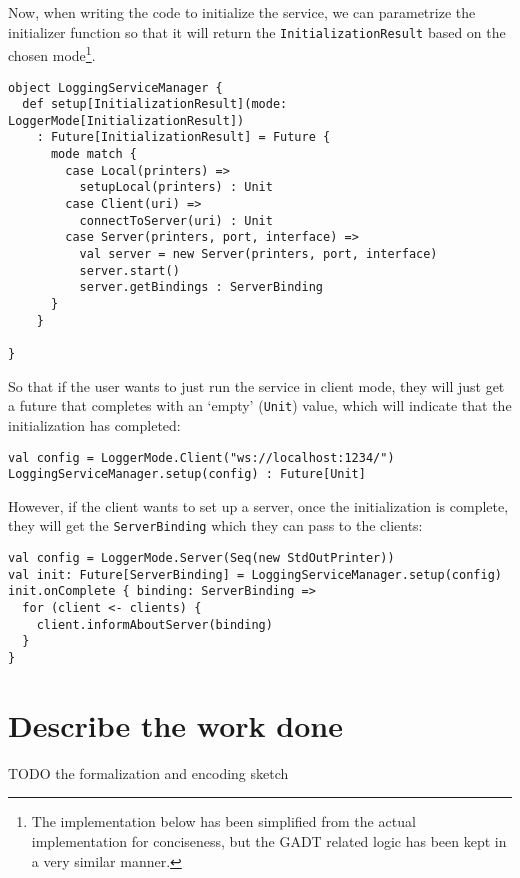 Now, when writing the code to initialize the service, we can parametrize the initializer function so that it will return the \texttt{InitializationResult} based on the chosen mode\footnote{The implementation below has been simplified from the actual implementation for conciseness, but the GADT related logic has been kept in a very similar manner.}.

\begin{verbatim}
object LoggingServiceManager {
  def setup[InitializationResult](mode: LoggerMode[InitializationResult])
    : Future[InitializationResult] = Future {
      mode match {
        case Local(printers) =>
          setupLocal(printers) : Unit
        case Client(uri) =>
          connectToServer(uri) : Unit
        case Server(printers, port, interface) =>
          val server = new Server(printers, port, interface)
          server.start()
          server.getBindings : ServerBinding
      }
    }
    
}
\end{verbatim}

So that if the user wants to just run the service in client mode, they will just get a future that completes with an `empty' (\texttt{Unit}) value, which will indicate that the initialization has completed:

\begin{verbatim}
val config = LoggerMode.Client("ws://localhost:1234/")
LoggingServiceManager.setup(config) : Future[Unit]
\end{verbatim}

However, if the client wants to set up a server, once the initialization is complete, they will get the \texttt{ServerBinding} which they can pass to the clients:

\begin{verbatim}
val config = LoggerMode.Server(Seq(new StdOutPrinter))
val init: Future[ServerBinding] = LoggingServiceManager.setup(config)
init.onComplete { binding: ServerBinding =>
  for (client <- clients) {
    client.informAboutServer(binding)
  }
}
\end{verbatim}

\section{Describe the work done}

TODO the formalization and encoding sketch
